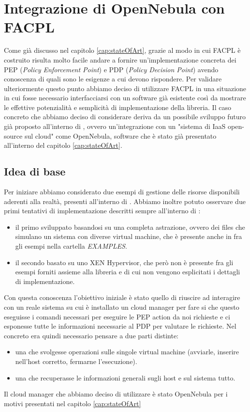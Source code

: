 
\chapter{Integrazione di OpenNebula con FACPL}
\label{cap:proposal}
Come già discusso nel capitolo \ref{cap:stateOfArt}, grazie al modo in cui FACPL\cite{facpl} è costruito risulta molto facile andare a fornire un'implementazione concreta dei PEP (\emph{Policy Enforcement Point}) e PDP (\emph{Policy Decision Point}) avendo conoscenza  di quali sono le esigenze a cui devono rispondere.\medbreak
Per validare ulteriormente questo punto abbiamo deciso di utilizzare FACPL in una situazione in cui fosse necessario interfacciarsi con un software già esistente così da mostrare le effettive potenzialità e semplicità di implementazione della libreria.
Il caso concreto che abbiamo deciso di considerare deriva da un possibile sviluppo futuro già proposto all'interno di \cite{10.1007/978-3-319-08260-8_6}, ovvero un'integrazione con un "sistema di IaaS open-source sul cloud" come OpenNebula\cite{opennebula}, software che è stato già presentato all'interno del capitolo \ref{cap:stateOfArt}.

\section{Idea di base}
Per iniziare abbiamo considerato due esempi di gestione delle risorse disponibili aderenti alla realtà, presenti all'interno di \cite{10.1007/978-3-319-08260-8_6}.
Abbiamo inoltre potuto osservare due primi tentativi di implementazione descritti sempre all'interno di \cite{10.1007/978-3-319-08260-8_6}:
\begin{itemize}
    \item il primo sviluppato basandosi su una completa astrazione, ovvero dei files che simulano un sistema con diverse virtual machine, che è presente anche in \cite{facpl-github} fra gli esempi nella cartella \emph{EXAMPLES}.
    \item il secondo basato su uno XEN Hypervisor, che però non è presente fra gli esempi forniti assieme alla libreria e di cui non vengono esplicitati i dettagli di implementazione.
\end{itemize}
Con questa conoscenza l'obiettivo iniziale è stato quello di riuscire ad interagire con un reale sistema su cui è installato un cloud manager per fare si che questo eseguisse i comandi necessari per eseguire le PEP action da noi richieste e ci esponesse tutte le informazioni necessarie al PDP per valutare le richieste.
Nel concreto era quindi necessario pensare a due parti distinte:
\begin{itemize}
    \item una che svolgesse operazioni sulle singole virtual machine (avviarle, inserire nell'host corretto, fermarne l'esecuzione).
    \item una che recuperasse le informazioni generali sugli host e sul sistema tutto.
\end{itemize}
Il cloud manager che abbiamo deciso di utilizzare è stato OpenNebula per i motivi presentati nel capitolo \ref{cap:stateOfArt}

